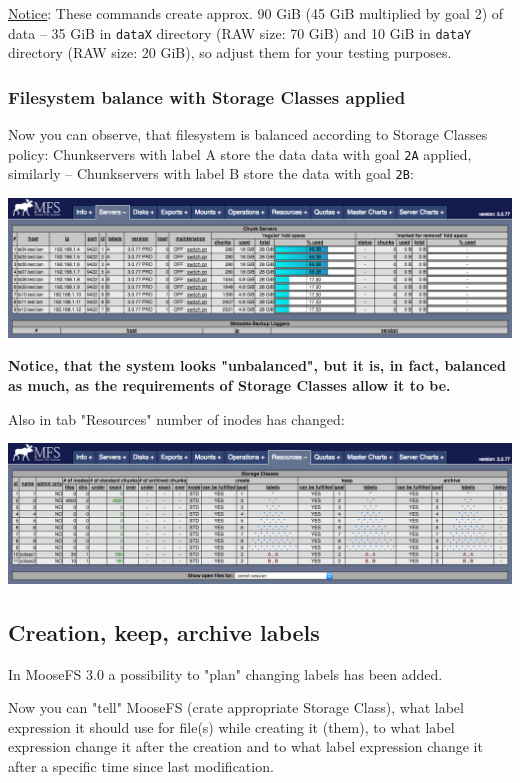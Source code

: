 \documentclass[a4paper,11pt,english]{report}
\def\code#1{\texttt{#1}}
\begin{document}
				\underline{Notice}: These commands create approx. 90 GiB (45 GiB multiplied by goal 2) of data -- 35 GiB in \code{dataX} directory (RAW size: 70 GiB) and 10 GiB in \code{dataY} directory (RAW size: 20 GiB), so adjust them for your testing purposes.
	
				\subsubsection{Filesystem balance with Storage Classes applied}
				Now you can observe, that filesystem is balanced according to Storage Classes policy: Chunkservers with label A store the data data with goal \code{2A} applied, similarly -- Chunkservers with label B store the data with goal \code{2B}:
				
				\includegraphics[width=1.0\textwidth]{images/cgi_labelsAB_data.png}
				
				\textbf{Notice, that the system looks "unbalanced", but it is, in fact, balanced as much, as the requirements of Storage Classes allow it to be.}
				
				Also in tab "Resources" number of inodes has changed:
				
				\includegraphics[width=1.0\textwidth]{images/cgi_resources2.png}
			
			\subsection{Creation, keep, archive labels}
			In MooseFS 3.0 a possibility to "plan" changing labels has been added.
			
			Now you can "tell" MooseFS (crate appropriate Storage Class), what label expression it should use for file(s) while creating it (them), to what label expression change it after the creation and to what label expression change it after a specific time since last modification.
			
\end{document}
